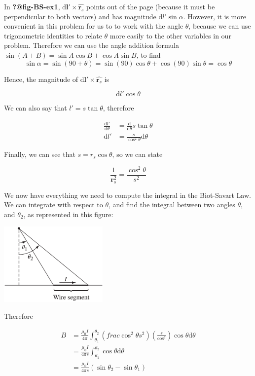 \documentclass[
  letterpaper,
  DIV=11,
  numbers=noendperiod]{scrreprt}
\begin{document}
In \textbf{?@fig-BS-ex1},
\(\mathrm{d} \mathrm{\mathbf{l}}' \times \hat{\mathrm{\mathbf{r}}_s}\)
points out of the page (because it must be perpendicular to both
vectors) and has magnitude \(\mathrm{d} l' \sin\alpha\). However, it is
more convenient in this problem for us to to work with the angle
\(\theta\), because we can use trigonometric identities to relate
\(\theta\) more easily to the other variables in our problem. Therefore
we can use the angle addition formula
\(\sin(A + B) = \sin A \cos B + \cos A \sin B\), to find
\[ \sin\alpha = \sin(90 + \theta) = \sin(90)\cos\theta + \cos(90)\sin\theta = \cos\theta \]

Hence, the magnitude of
\(\mathrm{d} \mathrm{\mathbf{l}}' \times \hat{\mathrm{\mathbf{r}}_s}\)
is

\[ \mathrm{d} l' \cos\theta \]

We can also say that \(l' = s \tan\theta\), therefore

\[ \begin{split} 
\frac{\mathrm{d} l'}{\mathrm{d} \theta} &=  \frac{\mathrm{d} }{\mathrm{d} \theta} s \tan\theta \\
\mathrm{d}l' &=  \frac{s}{ \cos^2 \theta} \mathrm{d}\theta
\end{split}
\]

Finally, we can see that \(s = r_s \cos \theta\), so we can state

\[ \frac{1}{\mathrm{\mathbf{r}}_s^2} = \frac{\cos^2 \theta}{s^2} \]

We now have everything we need to compute the integral in the
Biot-Savart Law. We can integrate with respect to \(\theta\), and find
the integral between two angles \(\theta_1\) and \(\theta_2\), as
represented in this figure:

\includegraphics[width=2.08333in,height=\textheight]{Figures/BS-example-2.png}

Therefore

\[ \begin{split} 
B &= \frac{\mu_0 I}{4 \pi} \int_{\theta_1}^{\theta_2} \left( frac{\cos^2 \theta }{s^2} \right) \left( \frac{s}{\cos^\theta} \right) \cos\theta \mathrm{d}\theta   \\
 &= \frac{\mu_0 I}{4 \pi s} \int_{\theta_1}^{\theta_2}  \cos\theta \mathrm{d}\theta \\
 &= \frac{\mu_0 I}{4 \pi s} (\sin\theta_2 - \sin \theta_1) 
\end{split}
\]
\end{document}

